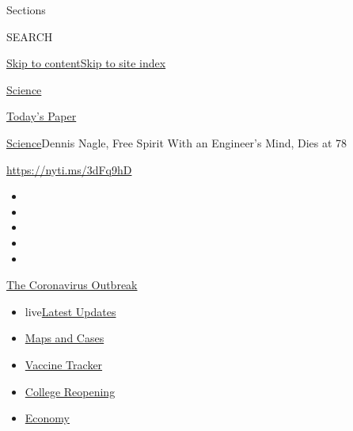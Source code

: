 Sections

SEARCH

\protect\hyperlink{site-content}{Skip to
content}\protect\hyperlink{site-index}{Skip to site index}

\href{https://www.nytimes.com/section/science}{Science}

\href{https://myaccount.nytimes.com/auth/login?response_type=cookie\&client_id=vi}{}

\href{https://www.nytimes.com/section/todayspaper}{Today's Paper}

\href{/section/science}{Science}\textbar{}Dennis Nagle, Free Spirit With
an Engineer's Mind, Dies at 78

\url{https://nyti.ms/3dFq9hD}

\begin{itemize}
\item
\item
\item
\item
\item
\end{itemize}

\href{https://www.nytimes.com/news-event/coronavirus?action=click\&pgtype=Article\&state=default\&region=TOP_BANNER\&context=storylines_menu}{The
Coronavirus Outbreak}

\begin{itemize}
\tightlist
\item
  live\href{https://www.nytimes.com/2020/08/03/world/coronavirus-covid-19.html?action=click\&pgtype=Article\&state=default\&region=TOP_BANNER\&context=storylines_menu}{Latest
  Updates}
\item
  \href{https://www.nytimes.com/interactive/2020/us/coronavirus-us-cases.html?action=click\&pgtype=Article\&state=default\&region=TOP_BANNER\&context=storylines_menu}{Maps
  and Cases}
\item
  \href{https://www.nytimes.com/interactive/2020/science/coronavirus-vaccine-tracker.html?action=click\&pgtype=Article\&state=default\&region=TOP_BANNER\&context=storylines_menu}{Vaccine
  Tracker}
\item
  \href{https://www.nytimes.com/2020/08/02/us/covid-college-reopening.html?action=click\&pgtype=Article\&state=default\&region=TOP_BANNER\&context=storylines_menu}{College
  Reopening}
\item
  \href{https://www.nytimes.com/live/2020/08/03/business/stock-market-today-coronavirus?action=click\&pgtype=Article\&state=default\&region=TOP_BANNER\&context=storylines_menu}{Economy}
\end{itemize}


